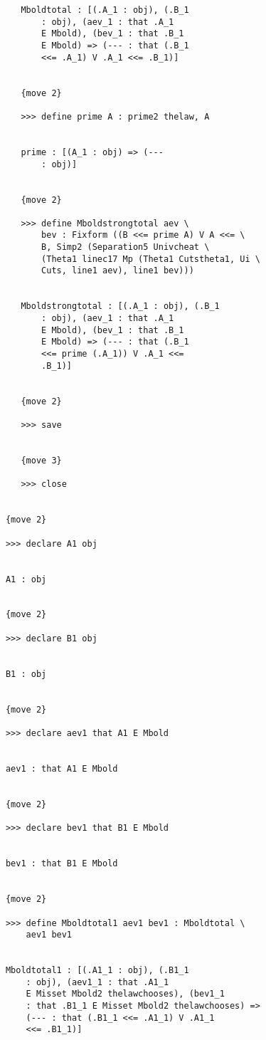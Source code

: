 \documentclass[12pt]{article}
\begin{document}
\begin{verbatim}
         Mboldtotal : [(.A_1 : obj), (.B_1 
             : obj), (aev_1 : that .A_1 
             E Mbold), (bev_1 : that .B_1 
             E Mbold) => (--- : that (.B_1 
             <<= .A_1) V .A_1 <<= .B_1)]


         {move 2}

         >>> define prime A : prime2 thelaw, A


         prime : [(A_1 : obj) => (--- 
             : obj)]


         {move 2}

         >>> define Mboldstrongtotal aev \
             bev : Fixform ((B <<= prime A) V A <<= \
             B, Simp2 (Separation5 Univcheat \
             (Theta1 linec17 Mp (Theta1 Cutstheta1, Ui \
             Cuts, line1 aev), line1 bev)))


         Mboldstrongtotal : [(.A_1 : obj), (.B_1 
             : obj), (aev_1 : that .A_1 
             E Mbold), (bev_1 : that .B_1 
             E Mbold) => (--- : that (.B_1 
             <<= prime (.A_1)) V .A_1 <<= 
             .B_1)]


         {move 2}

         >>> save


         {move 3}

         >>> close


      {move 2}

      >>> declare A1 obj


      A1 : obj


      {move 2}

      >>> declare B1 obj


      B1 : obj


      {move 2}

      >>> declare aev1 that A1 E Mbold


      aev1 : that A1 E Mbold


      {move 2}

      >>> declare bev1 that B1 E Mbold


      bev1 : that B1 E Mbold


      {move 2}

      >>> define Mboldtotal1 aev1 bev1 : Mboldtotal \
          aev1 bev1


      Mboldtotal1 : [(.A1_1 : obj), (.B1_1 
          : obj), (aev1_1 : that .A1_1 
          E Misset Mbold2 thelawchooses), (bev1_1 
          : that .B1_1 E Misset Mbold2 thelawchooses) => 
          (--- : that (.B1_1 <<= .A1_1) V .A1_1 
          <<= .B1_1)]



\end{verbatim}
\end{document}
